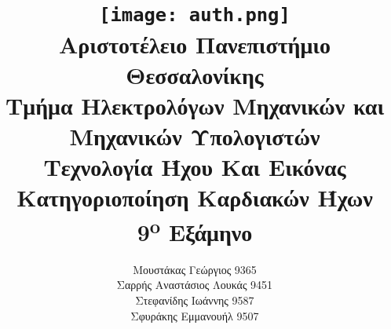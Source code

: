 \title{
	\texttt{[image: auth.png]}\\
	\large{Αριστοτέλειο Πανεπιστήμιο Θεσσαλονίκης}\\
	\large{Τμήμα Ηλεκτρολόγων Μηχανικών και Μηχανικών Υπολογιστών}\\
	\vspace{2cm}
	\LARGE{Τεχνολογία Ήχου Και Εικόνας\\Κατηγοριοποίηση Καρδιακών Ήχων}\\
	\vspace{0.5cm}
	\large{9\textsuperscript{o} Εξάμηνο}
	\vspace{3cm}
}

\author{
	Μουστάκας Γεώργιος 9365\\
	Σαρρής Αναστάσιος Λουκάς 9451\\
	Στεφανίδης Ιωάννης 9587\\
	Σφυράκης Εμμανουήλ 9507
	\vspace{3cm}
}
